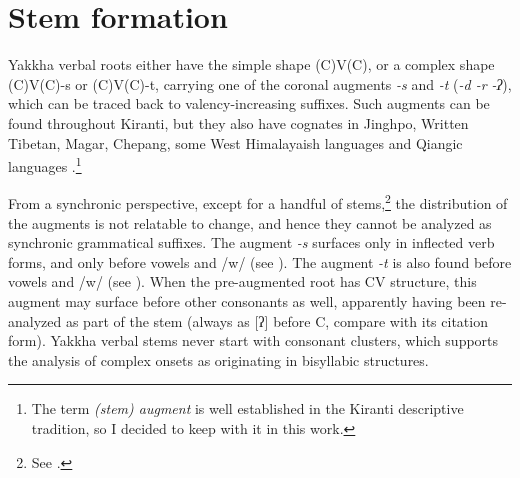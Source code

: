 
\section{Stem formation}\label{stem}

Yakkha verbal roots either have the simple shape (C)V(C), or a complex shape (C)V(C)-s or (C)V(C)-t, carrying one of the coronal augments  \emph{-s} and \emph{-t} (\emph{\ti -d \ti -r \ti -ʔ}), which can be traced back to valency-increasing suffixes. Such augments can be found throughout Kiranti, but they also have cognates in Jinghpo, Written Tibetan, Magar, Chepang, some West Himalayaish languages and Qiangic languages \citep[457--59]{Matisoff2003Handbook}.\footnote{The term \emph{(stem) augment} is well established in the Kiranti descriptive tradition, so I decided to keep with it in this work.} 

From a synchronic perspective, except for a handful of stems,\footnote{See .} the distribution of the augments is not relatable to  change, and hence they cannot be analyzed as synchronic grammatical suffixes. The augment \emph{-s} surfaces only in inflected verb forms, and only before vowels and /w/ (see \Next[a]). The augment \emph{-t} is also found before vowels and /w/ (see \Next[b]). When the pre-augmented root has CV structure, this augment may surface before other consonants as well, apparently having been re-analyzed as part of the  stem (always as [ʔ] before C, compare \Next[c] with its citation form). Yakkha verbal stems never start with consonant clusters, which supports the analysis of complex onsets as originating in bisyllabic structures. 

